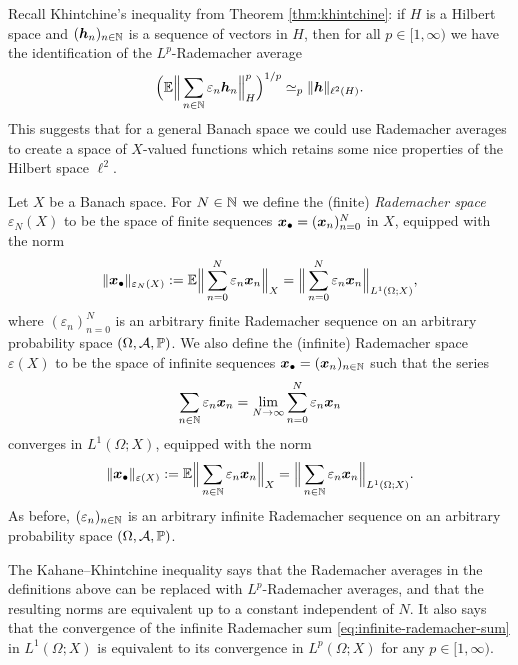 Recall Khintchine's inequality from Theorem \ref{thm:khintchine}: if $H$ is a Hilbert space and $(\bm{h}_{n})_{n \in \mathbb{N}}$ is a sequence of vectors in $H$, then for all $p \in [1,\infty)$ we have the identification of the $L^p$-Rademacher average
\begin{equation*}
  \Big( \mathbb{E} \Big\| \sum_{n \in \mathbb{N}} \varepsilon_{n} \bm{h}_{n} \Big\|_{H}^{p} \Big)^{1/p} \simeq_{p} \|\bm{h}\|_{\ell^2(H)}.
\end{equation*}
This suggests that for a general Banach space we could use Rademacher averages to create a space of $X$-valued functions which retains some nice properties of the Hilbert space $\ell^2$.

\begin{defn}
  Let $X$ be a Banach space.
  For $N \in \mathbb{N}$ we define the (finite) \emph{Rademacher space} $\varepsilon_{N}(X)$ to be the space of finite sequences $\bm{x}_{\bullet} = (\bm{x}_{n})_{n=0}^{N}$ in $X$, equipped with the norm
  \begin{equation*}
    \|\bm{x}_{\bullet}\|_{\varepsilon_{N}(X)} := \mathbb{E} \Big\| \sum_{n=0}^{N} \varepsilon_{n} \bm{x}_{n} \Big\|_{X} = \Big\| \sum_{n=0}^{N} \varepsilon_{n} \bm{x}_{n} \Big\|_{L^{1}(\Omega;X)},
  \end{equation*}
  where $(\varepsilon_{n})_{n = 0}^{N}$ is an arbitrary finite Rademacher sequence on an arbitrary probability space $(\Omega,\mathcal{A},\mathbb{P})$.
  We also define the (infinite) Rademacher space $\varepsilon(X)$ to be the space of infinite sequences $\bm{x}_{\bullet} = (\bm{x}_{n})_{n \in \mathbb{N}}$ such that the series
  \begin{equation}\label{eq:infinite-rademacher-sum}
    \sum_{n \in \mathbb{N}} \varepsilon_{n} \bm{x}_{n} = \lim_{N \to \infty} \sum_{n = 0}^{N} \varepsilon_{n} \bm{x}_{n}
  \end{equation}
  converges in $L^{1}(\Omega;X)$, equipped with the norm
  \begin{equation*}
    \|\bm{x}_{\bullet}\|_{\varepsilon(X)} := \mathbb{E} \Big\| \sum_{n \in \mathbb{N}} \varepsilon_{n} \bm{x}_{n} \Big\|_{X} = \Big\| \sum_{n \in \mathbb{N}} \varepsilon_{n} \bm{x}_{n} \Big\|_{L^{1}(\Omega;X)}.
  \end{equation*}
  As before, $(\varepsilon_{n})_{n \in \mathbb{N}}$ is an arbitrary infinite Rademacher sequence on an arbitrary probability space $(\Omega,\mathcal{A},\mathbb{P})$.
\end{defn}

\begin{rmk}
  The Kahane--Khintchine inequality says that the Rademacher averages in the definitions above can be replaced with $L^p$-Rademacher averages, and that the resulting norms are equivalent up to a constant independent of $N$.
  It also says that the convergence of the infinite Rademacher sum \eqref{eq:infinite-rademacher-sum} in $L^1(\Omega;X)$ is equivalent to its convergence in $L^p(\Omega;X)$ for any $p \in [1,\infty)$.
\end{rmk}

